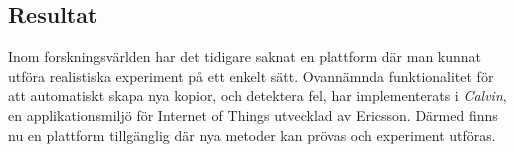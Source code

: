 \documentclass{article}
\begin{document}
\begin{multicols}{2}
\section*{Resultat}
Inom forskningsvärlden har det tidigare saknat en plattform där man kunnat utföra realistiska experiment på ett enkelt sätt. Ovannämnda funktionalitet för att automatiskt skapa nya kopior, och detektera fel, har implementerats i \emph{Calvin}, en applikationsmiljö för Internet of Things utvecklad av Ericsson. Därmed finns nu en plattform tillgänglig där nya metoder kan prövas och experiment utföras.

\end{multicols}
\end{document}
